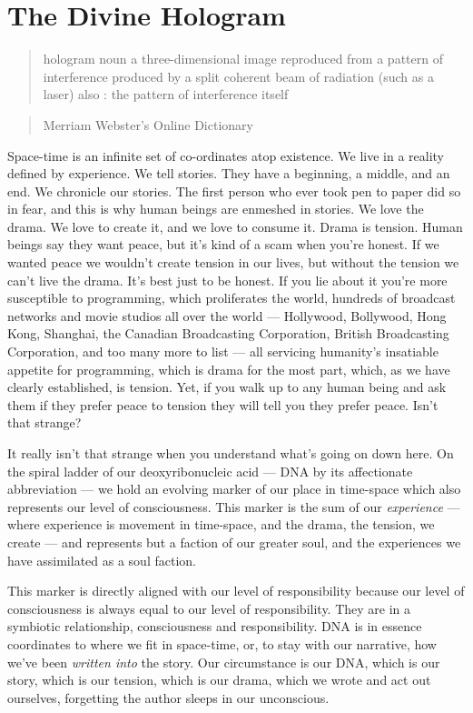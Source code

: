 \section*{The Divine Hologram}\label{the-divine-hologram}

\begin{quote}
hologram noun
a three-dimensional image reproduced from a pattern of interference produced by a split
coherent beam of radiation (such as a laser) also : the pattern of interference itself
\end{quote}

\begin{quote}
Merriam Webster's Online Dictionary
\end{quote}

Space-time is an infinite set of co-ordinates atop existence. We live in
a reality defined by experience.
We tell stories. They have a beginning, a middle, and an end. We
chronicle our stories. The first person who ever took pen to paper did
so in fear, and this is why human beings are enmeshed in stories. We
love the drama. We love to create it, and we love to consume it. Drama
is tension. Human beings say they want peace, but it's kind of a scam
when you're honest. If we wanted peace we wouldn't create tension in our
lives, but without the tension we can't live the drama. It's best just
to be honest. If you lie about it you're more susceptible to
programming, which proliferates the world, hundreds of broadcast
networks and movie studios all over the world --- Hollywood, Bollywood,
Hong Kong, Shanghai, the Canadian Broadcasting Corporation, British
Broadcasting Corporation, and too many more to list --- all servicing
humanity's insatiable appetite for programming, which is drama for the
most part, which, as we have clearly established, is tension. Yet, if
you walk up to any human being and ask them if they prefer peace to
tension they will tell you they prefer peace. Isn't that strange?

It really isn't that strange when you understand what's going on down
here. On the spiral ladder of our deoxyribonucleic acid --- DNA by its
affectionate abbreviation --- we hold an evolving marker of our place in
time-space which also represents our level of consciousness. This marker
is the sum of our \emph{experience} --- where experience is movement in
time-space, and the drama, the tension, we create --- and represents but
a faction of our greater soul, and the experiences we have assimilated
as a soul faction.

This marker is directly aligned with our level of responsibility because
our level of consciousness is always equal to our level of
responsibility. They are in a symbiotic relationship, consciousness and
responsibility. DNA is in essence coordinates to where we fit in
space-time, or, to stay with our narrative, how we've been \emph{written
into} the story. Our circumstance is our DNA, which is our story, which
is our tension, which is our drama, which we wrote and act out
ourselves, forgetting the author sleeps in our unconscious.

